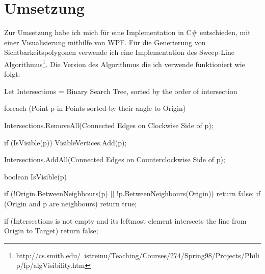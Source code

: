 \documentclass[12pt]{article}
\begin{document}
\section{Umsetzung}
Zur Umsetzung habe ich mich für eine Implementation in C\# entschieden, mit einer Visualisierung mithilfe von WPF.
Für die Generierung von Sichtbarkeitspolygonen verwende ich eine Implementation des Sweep-Line Algorithmus\footnote{http://cs.smith.edu/~istreinu/Teaching/Courses/274/Spring98/Projects/Philip/fp/algVisibility.htm}. Die Version des Algorithmus die ich verwende funktioniert wie folgt:
\begin{Csharp}
Let Intersections = Binary Search Tree, sorted by the order of intersection

foreach (Point p in Points sorted by their angle to Origin) {
	Intersections.RemoveAll(Connected Edges on Clockwise Side of p); 
	
	if (IsVisible(p)) VisibleVertices.Add(p);	
	
	Intersections.AddAll(Connected Edges on Counterclockwise Side of p);
}

boolean IsVisible(p) {
    if (!Origin.BetweenNeighbours(p) || !p.BetweenNeighbours(Origin)) return false;
    if (Origin and p are neighbours) return true;

    if (Intersections is not empty and its leftmost element intersects the line from Origin to Target) return false;
}
\end{Csharp}
\end{document}
